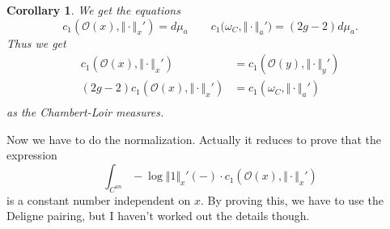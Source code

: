 \documentclass[reqno,11pt]{amsart}
\numberwithin{equation}{section}
\theoremstyle{plain}
\newtheorem{corollary}[theorem]{Corollary}
\theoremstyle{plain}
\numberwithin{equation}{section}
\theoremstyle{remark}
\newcommand{\norm}[1]{\Vert{#1}\Vert}
\begin{document}
\begin{corollary}
We get the equations
$$c_1(\mathcal{O}(x),\norm{\cdot}_x')=d\mu_a \qquad c_1\Big(\omega_C,\norm{\cdot}_a'\Big)=(2g-2)d\mu_a.$$
Thus we get 
\begin{equation*}
\begin{aligned}
  c_1(\mathcal{O}(x),\norm{\cdot}_x')&=c_1(\mathcal{O}(y),\norm{\cdot}_y')  \\ 
  (2g-2)c_1(\mathcal{O}(x),\norm{\cdot}_x')&=c_1(\omega_C,\norm{\cdot}_a')  \\ 
\end{aligned}
\end{equation*}
as the Chambert-Loir measures.
\end{corollary}

Now we have to do the normalization. Actually it reduces to prove that the expression
$$\int_{C^{an}}-\log \norm{1}_x'(-) \cdot c_1(\mathcal{O}(x),\norm{\cdot}_x')$$
is a constant number independent on $x$. By proving this, we have to use the Deligne pairing, but I haven't worked out the details though.


\end{document}

